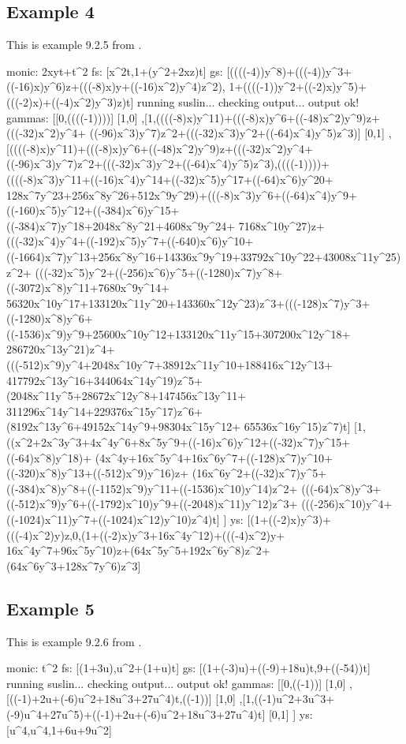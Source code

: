 \subsection {Example 4}

This is example 9.2.5 from \citep{fabianskaquadrat07}.


\begin{code}
monic: 2xyt+t^2
fs: [x^2t,1+(y^2+2xz)t]
gs: [((((-4))y^8)+(((-4))y^3+((-16)x)y^6)z+(((-8)x)y+((-16)x^2)y^4)z^2),
     1+((((-1))y^2+((-2)x)y^5)+(((-2)x)+((-4)x^2)y^3)z)t]
running suslin...
checking output...
output ok!
gammas: 
[[0,((((-1))))]
[1,0]
,[1,((((-8)x)y^11)+(((-8)x)y^6+((-48)x^2)y^9)z+(((-32)x^2)y^4+
    ((-96)x^3)y^7)z^2+(((-32)x^3)y^2+((-64)x^4)y^5)z^3)]
[0,1]
,[((((-8)x)y^11)+(((-8)x)y^6+((-48)x^2)y^9)z+(((-32)x^2)y^4+
  ((-96)x^3)y^7)z^2+(((-32)x^3)y^2+((-64)x^4)y^5)z^3),((((-1))))+
  ((((-8)x^3)y^11+((-16)x^4)y^14+((-32)x^5)y^17+((-64)x^6)y^20+
  128x^7y^23+256x^8y^26+512x^9y^29)+(((-8)x^3)y^6+((-64)x^4)y^9+
  ((-160)x^5)y^12+((-384)x^6)y^15+((-384)x^7)y^18+2048x^8y^21+4608x^9y^24+
  7168x^10y^27)z+(((-32)x^4)y^4+((-192)x^5)y^7+((-640)x^6)y^10+
  ((-1664)x^7)y^13+256x^8y^16+14336x^9y^19+33792x^10y^22+43008x^11y^25)z^2+
  (((-32)x^5)y^2+((-256)x^6)y^5+((-1280)x^7)y^8+((-3072)x^8)y^11+7680x^9y^14+
  56320x^10y^17+133120x^11y^20+143360x^12y^23)z^3+(((-128)x^7)y^3+
  ((-1280)x^8)y^6+((-1536)x^9)y^9+25600x^10y^12+133120x^11y^15+307200x^12y^18+
  286720x^13y^21)z^4+(((-512)x^9)y^4+2048x^10y^7+38912x^11y^10+188416x^12y^13+
  417792x^13y^16+344064x^14y^19)z^5+(2048x^11y^5+28672x^12y^8+147456x^13y^11+
  311296x^14y^14+229376x^15y^17)z^6+(8192x^13y^6+49152x^14y^9+98304x^15y^12+
  65536x^16y^15)z^7)t]
[1,((x^2+2x^3y^3+4x^4y^6+8x^5y^9+((-16)x^6)y^12+((-32)x^7)y^15+((-64)x^8)y^18)+
(4x^4y+16x^5y^4+16x^6y^7+((-128)x^7)y^10+((-320)x^8)y^13+((-512)x^9)y^16)z+
(16x^6y^2+((-32)x^7)y^5+((-384)x^8)y^8+((-1152)x^9)y^11+((-1536)x^10)y^14)z^2+
(((-64)x^8)y^3+((-512)x^9)y^6+((-1792)x^10)y^9+((-2048)x^11)y^12)z^3+
(((-256)x^10)y^4+((-1024)x^11)y^7+((-1024)x^12)y^10)z^4)t]
]
ys: 
[(1+((-2)x)y^3)+(((-4)x^2)y)z,0,(1+((-2)x)y^3+16x^4y^12)+(((-4)x^2)y+
 16x^4y^7+96x^5y^10)z+(64x^5y^5+192x^6y^8)z^2+(64x^6y^3+128x^7y^6)z^3]
\end{code}

\subsection{Example 5}

This is example 9.2.6 from \citep{fabianskaquadrat07}.

\begin{code}
monic: t^2
fs: [(1+3u),u^2+(1+u)t]
gs: [(1+(-3)u)+((-9)+18u)t,9+((-54))t]
running suslin...
checking output...
output ok!
gammas: 
[[0,((-1))]
[1,0]
,[((-1)+2u+(-6)u^2+18u^3+27u^4)t,((-1))]
[1,0]
,[1,((-1)u^2+3u^3+(-9)u^4+27u^5)+((-1)+2u+(-6)u^2+18u^3+27u^4)t]
[0,1]
]
ys: 
[u^4,u^4,1+6u+9u^2]
\end{code}

